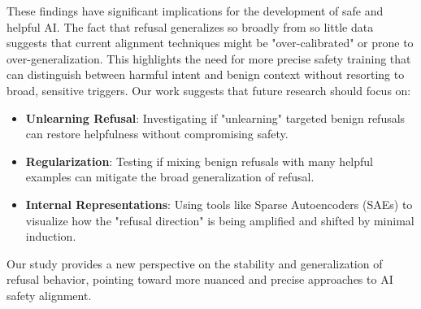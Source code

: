  These findings have significant implications for the development of safe and helpful AI. The fact that refusal generalizes so broadly from so little data suggests that current alignment techniques might be "over-calibrated" or prone to over-generalization. This highlights the need for more precise safety training that can distinguish between harmful intent and benign context without resorting to broad, sensitive triggers. Our work suggests that future research should focus on:
\begin{itemize}[leftmargin=*,itemsep=0pt,topsep=0pt]
    \item \textbf{Unlearning Refusal}: Investigating if "unlearning" targeted benign refusals can restore helpfulness without compromising safety.
    \item \textbf{Regularization}: Testing if mixing benign refusals with many helpful examples can mitigate the broad generalization of refusal.
    \item \textbf{Internal Representations}: Using tools like Sparse Autoencoders (SAEs) to visualize how the "refusal direction" is being amplified and shifted by minimal induction.
\end{itemize}
Our study provides a new perspective on the stability and generalization of refusal behavior, pointing toward more nuanced and precise approaches to AI safety alignment.
